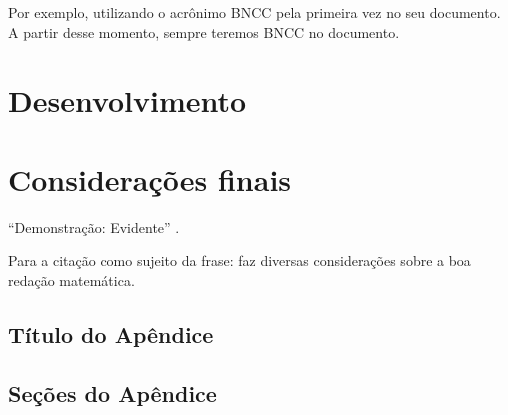 \documentclass[mestre]{wstex}
\begin{document}
Por exemplo, utilizando o acrônimo \ac{BNCC} pela primeira vez no seu documento. A partir desse momento, sempre teremos \ac{BNCC} no documento.

\chapter{Desenvolvimento}       %

\chapter{Considerações finais}  %

``Demonstração: Evidente'' \cite[p. 154]{elon}.

Para a citação como sujeito da frase: \textcites{cordeiro} faz diversas considerações sobre a boa redação matemática.





\begin{spacing}{1.0}  %
	\printbibliography
\end{spacing}



\begin{appendices}

	\chapter{Título do Apêndice}

	\section{Seções do Apêndice}

\end{appendices}
\end{document}
